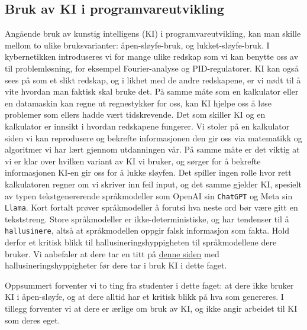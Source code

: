 \begin{alphasection}
\section{Bruk av KI i programvareutvikling}\label{sec:3-bruk-av-KI}
Angående bruk av kunstig intelligens (KI) i programvareutvikling, kan man skille mellom to ulike bruksvarianter: åpen-sløyfe-bruk, og lukket-sløyfe-bruk. I kybernetikken introduseres vi for mange ulike redskap som vi kan benytte oss av til problemløsning, for eksempel Fourier-analyse og PID-regulatorer. KI kan også sees på som et slikt redskap, og i likhet med de andre redskapene, er vi nødt til å vite hvordan man faktisk skal bruke det. På samme måte som en kalkulator eller en datamaskin kan regne ut regnestykker for oss, kan KI hjelpe oss å løse problemer som ellers hadde vært tidskrevende. Det som skiller KI og en kalkulator er innsikt i hvordan redskapene fungerer. Vi stoler på en kalkulator siden vi kan reprodusere og bekrefte informasjonen den gir oss via matematikk og algoritmer vi har lært gjennom utdanningen vår. På samme måte er det viktig at vi er klar over hvilken variant av KI vi bruker, og sørger for å bekrefte informasjonen KI-en gir oss for å lukke sløyfen. Det spiller ingen rolle hvor rett kalkulatoren regner om vi skriver inn feil input, og det samme gjelder KI, spesielt av typen tekstgenererende språkmodeller som OpenAI sin \verb|ChatGPT| og Meta sin \verb|Llama|. Kort fortalt prøver språkmodeller å forutsi hva neste ord bør være gitt en tekststreng. Store språkmodeller er ikke-deterministiske, og har tendenser til å \verb|hallusinere|, altså at språkmodellen oppgir falsk informasjon som fakta. Hold derfor et kritisk blikk til hallusineringshyppigheten til språkmodellene dere bruker. Vi anbefaler at dere tar en titt på \href{https://huggingface.co/spaces/vectara/leaderboard}{denne siden} med hallusineringshyppigheter før dere tar i bruk KI i dette faget.

Oppsummert forventer vi to ting fra studenter i dette faget: at dere ikke bruker KI i åpen-sløyfe, og at dere alltid har et kritisk blikk på hva som genereres. I tillegg forventer vi at dere er ærlige om bruk av KI, og ikke angir arbeidet til KI som deres eget. 

\end{alphasection}

\setcounter{section}{0}